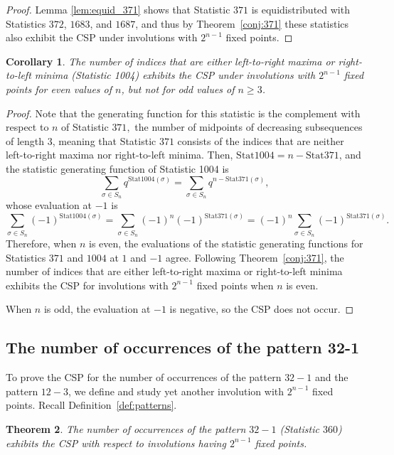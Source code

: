 \documentclass{amsart}
\newtheorem{thm}{Theorem}[section]
\newtheorem{cor}[thm]{Corollary}
\theoremstyle{definition}
\begin{document}
\begin{proof}
  Lemma \ref{lem:equid_371} shows that Statistic $371$ is equidistributed with Statistics $372$, $1683$, and $1687$, and thus by Theorem~\ref{conj:371} these statistics also exhibit the CSP under involutions with $2^{n-1}$ fixed points.
\end{proof}
 
\begin{cor}\label{cor:Corteel_1004}
  The number of indices that are either left-to-right maxima or right-to-left minima (Statistic 1004) exhibits the CSP under involutions with $2^{n-1}$ fixed points for even values of $n$, but not for odd values of $n \geq 3$.
\end{cor}
\begin{proof}
  Note that the generating function for this statistic is the complement with respect to $n$ of Statistic $371,$ the number of midpoints of decreasing subsequences of length $3$, meaning that Statistic $371$ consists of the indices that are neither left-to-right maxima nor right-to-left minima. Then, $\mathrm{Stat}1004 = n - \mathrm{Stat}371$, and the statistic generating function of Statistic 1004 is
  \[ \sum_{\sigma\in S_n} q^{\mathrm{Stat}1004(\sigma) } = \sum_{\sigma\in S_n} q^{n-\mathrm{Stat}371(\sigma)},\]
  whose evaluation at $-1$ is
  \[ \sum_{\sigma\in S_n} (-1)^{\mathrm{Stat}1004(\sigma) } = \sum_{\sigma\in S_n} (-1)^n (-1)^{\mathrm{Stat}371(\sigma)}= (-1)^n \sum_{\sigma\in S_n} (-1)^{\mathrm{Stat}371(\sigma)}.\]
  Therefore, when $n$ is even, the evaluations of the statistic generating functions for Statistics $371$ and $1004$ at $1$ and $-1$ agree. Following Theorem~\ref{conj:371}, the number of indices that are either left-to-right maxima or right-to-left minima exhibits the CSP for involutions with $2^{n-1}$ fixed points when $n$ is even.
  
  When $n$ is odd, the evaluation at $-1$ is negative, so the CSP does not occur.
\end{proof}


\subsection{The  number of occurrences of the pattern 32-1}\label{subsec:Corteel 321} 


To prove the CSP for the number of occurrences of the pattern $32 - 1$ and the pattern $12-3$, we define and study yet another involution with $2^{n-1}$ fixed points. 
Recall Definition~\ref{def:patterns}.
\begin{thm}\label{thm:357}
The number of occurrences of the pattern $32-1$ (Statistic $360$) exhibits the CSP with respect to involutions having $2^{n-1}$ fixed points.  
\end{thm}
\end{document}
